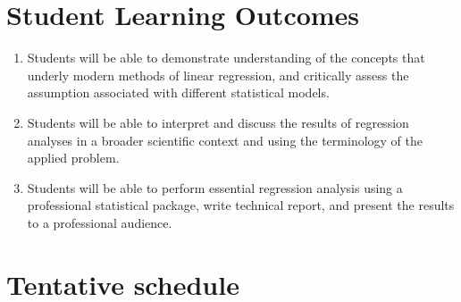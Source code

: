 \documentclass[11pt,onecolumn]{article}
\begin{document}
\section{Student Learning Outcomes}
\begin{enumerate}
\item Students will be able to demonstrate understanding of the concepts that underly modern methods of linear regression, and critically assess the assumption associated with different statistical models.
\item Students will be able to interpret and discuss the results of regression analyses in a broader scientific context and using the terminology of the applied problem.
\item Students will be able to perform essential regression analysis using a professional statistical package, write technical report, and present the results to a professional audience.
\end{enumerate}
\section{Tentative schedule}
\end{document}
